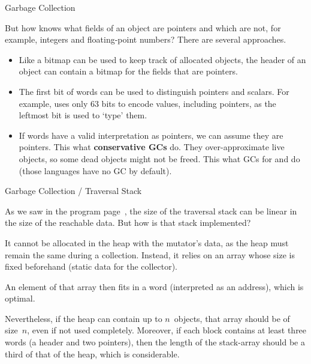 \documentclass[compress,dvipdfmx]{beamer}
\begin{document}
%
\begin{frame}{Garbage Collection}

  But how  knows what fields of an object are pointers
  and which are not, for example, integers and floating\hyp{}point
  numbers? There are several approaches.
  \begin{itemize}

    \item Like a bitmap can be used to keep track of allocated
      objects, the header of an object can contain a bitmap for the
      fields that are pointers.

    \item The first bit of words can be used to distinguish pointers
      and scalars. For example, \OCaml uses only 63 bits to encode
      values, including pointers, as the leftmost bit is used to
      `type' them.

    \item If words have a valid interpretation as pointers, we can
      assume they are pointers. This what \textbf{conservative GCs}
      do. They over\hyp{}approximate live objects, so some dead
      objects might not be freed. This what GCs for \C and \Cpp do
      (those languages have no GC by default).

  \end{itemize}

\end{frame}

%
\begin{frame}{Garbage Collection / Traversal Stack}

  As we saw in the program page~\pageref{Mark}, the size of the
  traversal stack can be linear in the size of the reachable data. But
  how is that stack implemented?

  \bigskip

  It cannot be allocated in the heap with the mutator's data, as the
  heap must remain the same during a collection. Instead, it relies on
  an array whose size is fixed beforehand (static data for the
  collector).

  \bigskip

  An element of that array then fits in a word (interpreted as an
  address), which is optimal.

  \bigskip

  Nevertheless, if the heap can contain up to \(n\)~objects, that
  array should be of size~\(n\), even if not used
  completely. Moreover, if each block contains at least three words (a
  header and two pointers), then the length of the stack-array should
  be a third of that of the heap, which is considerable.

\end{frame}
\end{document}
